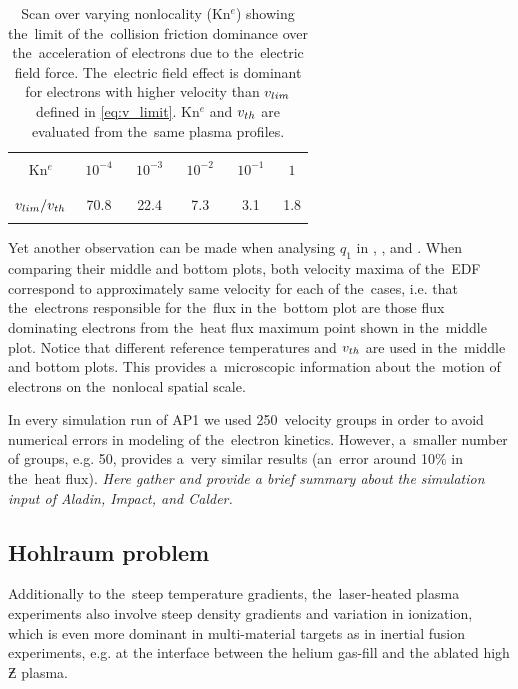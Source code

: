 \begin{table}
\begin{center}
  \begin{tabular}{c|ccccc}
    \hline\hline\\
    Kn$^e$ & $\,\,10^{-4}\,\,$ & $\,\,10^{-3}\,\,$ & $\,\,10^{-2}\,\,$ & $\,\,10^{-1}\,\,$ & $\,\,1\,\,$ \\\\
    \hline\\
    $v_{lim} / v_{th}$ & 70.8 & 22.4 & 7.3 & 3.1 & 1.8\\\\
    \hline\hline
  \end{tabular}
  \caption{
  Scan over varying nonlocality (Kn$^e$) showing the~limit of 
  the~collision friction dominance over the~acceleration of electrons 
  due to the~electric field force. The~electric field effect is dominant
  for electrons with higher velocity than $v_{lim}$ defined in 
  \eqref{eq:v_limit}. Kn$^e$ and $v_{th}$ are evaluated from the~same 
  plasma profiles.
  }
\label{tab:vlim}
\end{center}
\end{table}

Yet another observation can be made when analysing $q_1$ 
in , , and 
. When comparing their middle and bottom plots,
both velocity maxima of the~EDF correspond to approximately same velocity
for each of the~cases, i.e. that the~electrons responsible for the~flux in
the~bottom plot are those flux dominating electrons from the~heat flux
maximum point shown in the~middle plot. Notice that different reference 
temperatures and $v_{th}$ are used in the~middle and bottom plots. 
This provides a~microscopic information
about the~motion of electrons on the~nonlocal spatial scale. 

In every simulation run of AP1 we used 250~velocity groups in order to avoid
numerical errors in modeling of the~electron kinetics. However, a~smaller 
number of groups, e.g. 50, provides a~very similar results 
(an~error around 10$\%$ in the~heat flux). 
\textit{Here gather and provide a brief summary about the simulation input of
Aladin, Impact, and Calder.}

\subsection{Hohlraum problem}
Additionally to the~steep temperature gradients, the~laser-heated plasma 
experiments also involve steep density gradients and variation in ionization,
which is even more dominant in multi-material targets as in inertial
fusion experiments, e.g. at the interface between the helium gas-fill and 
the ablated high $\Zbar$ plasma.

